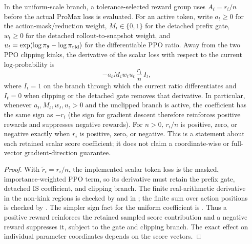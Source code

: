 \begin{proposition}
\label{prop:uniform-coefficient-sign}
In the uniform-scale branch, a tolerance-selected reward group uses $A_i=r_i/n$ before the
actual ProMax loss is evaluated.  For an active token, write $a_t\ge0$ for
the action-mask/reduction weight, $M_t\in\{0,1\}$ for the detached prefix
gate, $w_t\ge0$ for the detached rollout-to-snapshot weight, and
$u_t=\exp(\log\pi_{\theta}-\log\pi_{\mathrm{old}})$ for the differentiable PPO ratio.  Away
from the two PPO clipping kinks, the derivative of the scalar loss with
respect to the current log-probability is
\[
 -a_tM_tw_tu_t\,\frac{r_i}{n}\,I_t,
\]
where $I_t=1$ on the branch through which the current ratio differentiates
and $I_t=0$ when clipping or the detached gate removes that derivative.  In
particular, whenever $a_t,M_t,w_t,u_t>0$ and the unclipped branch is active,
the coefficient has the same sign as $-r_i$ (the sign for gradient descent
therefore reinforces positive rewards and suppresses negative rewards).
For $n>0$, $r_i/n$ is positive, zero, or negative exactly when $r_i$ is
positive, zero, or negative.  This is a statement about each retained
scalar score coefficient; it does not claim a coordinate-wise or full-vector
gradient-direction guarantee.
\end{proposition}

\begin{proof}
With $\tilde{r}_i = r_i/n$, the implemented scalar token loss is the
masked, importance-weighted PPO term, so its derivative must retain the
prefix gate, detached IS coefficient, and clipping branch.  The finite
real-arithmetic derivative in the non-kink regions is checked by
 and  in
; the finite sum over action positions is
checked by .  The simpler sign fact for
the uniform coefficient is .
Thus a positive reward reinforces the retained sampled score contribution
and a negative reward suppresses it, subject to the gate and clipping
branch.  The exact effect on individual parameter coordinates depends on
the score vectors.
\end{proof}


